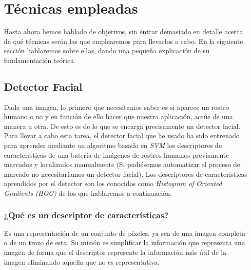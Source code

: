 \documentclass[a4paper,11pt]{book}
\begin{document}
\section{Técnicas empleadas}
\label{sec:tecnicas}
Hasta ahora hemos hablado de objetivos, sin entrar demasiado en detalle acerca de qué técnicas serán las que emplearemos para llevarlos a cabo. En la siguiente sección hablaremos sobre ellas, dando una pequeña explicación de su fundamentación teórica.
\subsection{Detector Facial}\label{sub:detectorFacial}
Dada una imagen, lo primero que necesitamos saber es si aparece un rostro humano o no y en función de ello hacer que nuestra aplicación, actúe de una manera u otra. De esto es de lo que se encarga precisamente un detector facial.\\
Para llevar a cabo esta tarea, el detector facial que he usado ha sido entrenado para aprender mediante un algoritmo basado en \textit{SVM}\cite{cortes_vapnik95} los descriptores de características de una batería de imágenes de rostros humanos previamente marcados y localizados manualmente (Si pudiésemos automatizar el proceso de marcado no necesitaríamos un detector facial). Los descriptores de características aprendidos por el detector son los conocidos como \textit{Histogram of Oriented Gradients (HOG)}\cite{dalal_triggs05} de los que hablaremos a continuación.
\subsubsection{¿Qué es un descriptor de características?}
Es una representación de un conjunto de píxeles, ya sea de una imagen completa o de un trozo de esta. Su misión es simplificar la información que representa una imagen de forma que el descriptor represente la información más útil de la imagen eliminando aquella que no es representativa.
\end{document}
